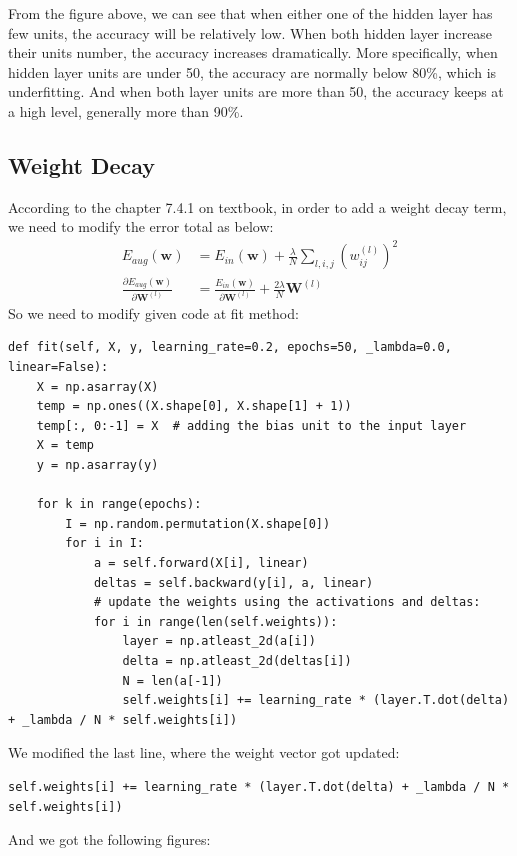 \documentclass{article}
\begin{document}
From the figure above, we can see that when either one of the hidden layer has few units, the accuracy will be relatively low. When both hidden layer increase their units number, the accuracy increases dramatically. More specifically, when hidden layer units are under 50, the accuracy are normally below 80\%, which is underfitting. And when both layer units are more than 50, the accuracy keeps at a high level, generally more than 90\%. 

\subsection{Weight Decay}
According to the chapter 7.4.1 on textbook, in order to add a weight decay term, we need to modify the error total as below:
\begin{align}
E_{aug}(\mathbf{w})&=E_{in}(\mathbf{w})+\frac{\lambda}{N}\sum_{l,i,j}(w_{ij}^{(l)})^{2}\\
\frac{\partial E_{aug}(\mathbf{w})}{\partial \mathbf{W}^{(l)}}&=\frac{E_{in}(\mathbf{w})}{\partial \mathbf{W}^{(l)}}+\frac{2\lambda}{N}\mathbf{W}^{(l)}
\end{align}
So we need to modify given code at fit method:
\begin{lstlisting}
def fit(self, X, y, learning_rate=0.2, epochs=50, _lambda=0.0, linear=False):
	X = np.asarray(X)
	temp = np.ones((X.shape[0], X.shape[1] + 1))
	temp[:, 0:-1] = X  # adding the bias unit to the input layer
	X = temp
	y = np.asarray(y)
	
	for k in range(epochs):
		I = np.random.permutation(X.shape[0])
		for i in I:
			a = self.forward(X[i], linear)
			deltas = self.backward(y[i], a, linear)
			# update the weights using the activations and deltas:
			for i in range(len(self.weights)):
				layer = np.atleast_2d(a[i])
				delta = np.atleast_2d(deltas[i])
				N = len(a[-1])
				self.weights[i] += learning_rate * (layer.T.dot(delta) + _lambda / N * self.weights[i])
\end{lstlisting}
We modified the last line, where the weight vector got updated:
\begin{lstlisting}
self.weights[i] += learning_rate * (layer.T.dot(delta) + _lambda / N * self.weights[i])
\end{lstlisting}
And we got the following figures:
\end{document}
